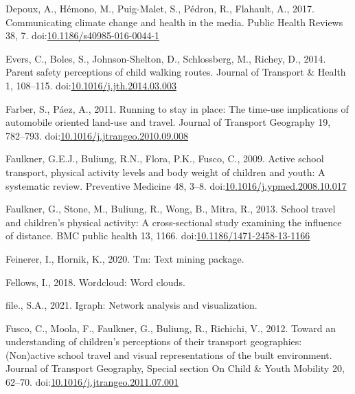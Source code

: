 \documentclass[]{elsarticle} %
\newlength{\cslhangindent}
\newlength{\cslentryspacingunit} %
\newenvironment{CSLReferences}[2] %
 {%
  \setlength{\parindent}{0pt}
  \ifodd #1
  \let\oldpar\par
  \def\par{\hangindent=\cslhangindent\oldpar}
  \fi
  \setlength{\parskip}{#2\cslentryspacingunit}
 }%
 {}
\begin{document}
\begin{CSLReferences}{1}{0}
\leavevmode{}%
Depoux, A., Hémono, M., Puig-Malet, S., Pédron, R., Flahault, A., 2017.
Communicating climate change and health in the media. Public Health
Reviews 38, 7.
doi:\href{https://doi.org/10.1186/s40985-016-0044-1}{10.1186/s40985-016-0044-1}

\leavevmode{}%
Evers, C., Boles, S., Johnson-Shelton, D., Schlossberg, M., Richey, D.,
2014. Parent safety perceptions of child walking routes. Journal of
Transport \& Health 1, 108--115.
doi:\href{https://doi.org/10.1016/j.jth.2014.03.003}{10.1016/j.jth.2014.03.003}

\leavevmode{}%
Farber, S., Páez, A., 2011. Running to stay in place: The time-use
implications of automobile oriented land-use and travel. Journal of
Transport Geography 19, 782--793.
doi:\href{https://doi.org/10.1016/j.jtrangeo.2010.09.008}{10.1016/j.jtrangeo.2010.09.008}

\leavevmode{}%
Faulkner, G.E.J., Buliung, R.N., Flora, P.K., Fusco, C., 2009. Active
school transport, physical activity levels and body weight of children
and youth: A systematic review. Preventive Medicine 48, 3--8.
doi:\href{https://doi.org/10.1016/j.ypmed.2008.10.017}{10.1016/j.ypmed.2008.10.017}

\leavevmode{}%
Faulkner, G., Stone, M., Buliung, R., Wong, B., Mitra, R., 2013. School
travel and children's physical activity: A cross-sectional study
examining the influence of distance. BMC public health 13, 1166.
doi:\href{https://doi.org/10.1186/1471-2458-13-1166}{10.1186/1471-2458-13-1166}

\leavevmode{}%
Feinerer, I., Hornik, K., 2020. Tm: Text mining package.

\leavevmode{}%
Fellows, I., 2018. Wordcloud: Word clouds.

\leavevmode{}%
file., S.A., 2021. Igraph: Network analysis and visualization.

\leavevmode{}%
Fusco, C., Moola, F., Faulkner, G., Buliung, R., Richichi, V., 2012.
Toward an understanding of children's perceptions of their transport
geographies: (Non)active school travel and visual representations of the
built environment. Journal of Transport Geography, Special {section On
Child} \& {Youth Mobility} 20, 62--70.
doi:\href{https://doi.org/10.1016/j.jtrangeo.2011.07.001}{10.1016/j.jtrangeo.2011.07.001}


\end{CSLReferences}
\end{document}
